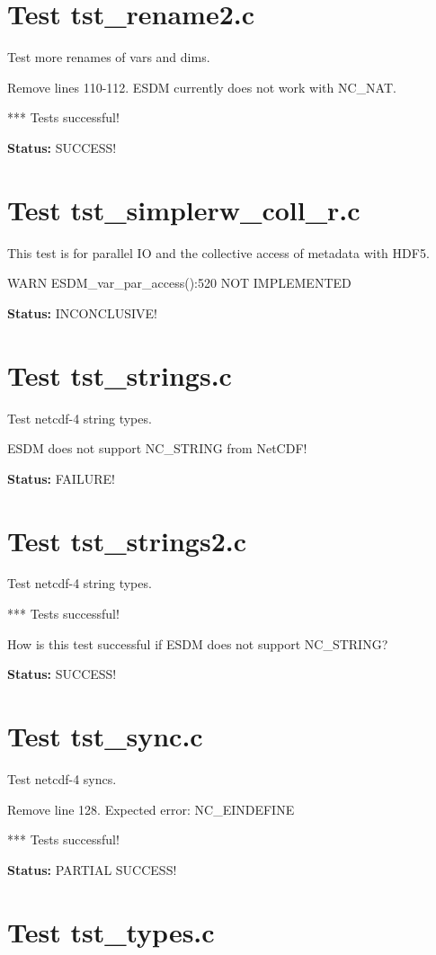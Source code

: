 \section{Test tst\_rename2.c}

Test more renames of vars and dims.

Remove lines 110-112. ESDM currently does not work with NC\_NAT.

*** Tests successful!

{\bf \large Status: } SUCCESS!

\section{Test tst\_simplerw\_coll\_r.c}

This test is for parallel IO and the collective access of metadata with HDF5.

WARN ESDM\_var\_par\_access():520 NOT IMPLEMENTED

{\bf \large Status: } INCONCLUSIVE!

\section{Test tst\_strings.c}

Test netcdf-4 string types.

ESDM does not support NC\_STRING from NetCDF!

{\bf \large Status: } FAILURE!

\section{Test tst\_strings2.c}

Test netcdf-4 string types.

*** Tests successful!

How is this test successful if ESDM does not support NC\_STRING?

{\bf \large Status: } SUCCESS!

\section{Test tst\_sync.c}

Test netcdf-4 syncs.

Remove line 128. Expected error: NC\_EINDEFINE

*** Tests successful!

{\bf \large Status: } PARTIAL SUCCESS!

\section{Test tst\_types.c}

